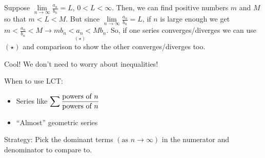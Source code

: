 \begin{Proof}{}{}
    Suppose $ \displaystyle \lim\limits_{{n} \to {\infty}} \frac{a_n}{b_n} =L $, $ 0<L<\infty $. Then,
    we can find positive numbers $ m $ and $ M $ so that $ m<L<M $. But since
    $ \displaystyle \lim\limits_{{n} \to {\infty}} \frac{a_n}{b_n} =L $, if $ n $ is large
    enough we get $ \displaystyle  m<\frac{a_n}{b_n} < M \rightarrow \underset{(\star)}{\boxed{mb_n<a_n<Mb_n}} $.
    So, if one series converges/diverges we can use $ (\star) $ and comparison
    to show the other converges/diverges too.
\end{Proof}

Cool! We don't need to worry about inequalities!

\begin{Remark}{}{}
    When to use LCT\@:
    \begin{itemize}
        \item Series like $ \displaystyle \sum \frac{\text{powers of $ n $}}{\text{powers of $ n $}} $
        \item ``Almost'' geometric series
    \end{itemize}
    Strategy: Pick the dominant terms $ \left( \text{as } n\rightarrow \infty \right) $
    in the numerator and denominator to compare to.
\end{Remark}

